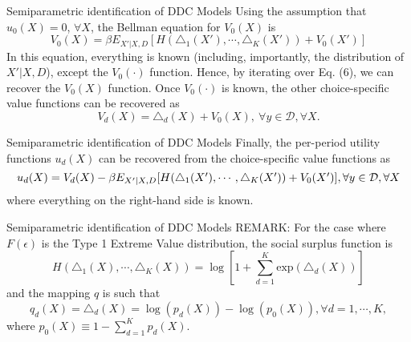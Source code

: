 \begin{frame}{Semiparametric identification of DDC Models}
Using the assumption that $u_0(X) = 0$, $\forall X$, the Bellman equation for $V_0(X)$ is 
\begin{equation}
V_0(X) = \beta E_{X'|X,D} [ H (\triangle_1(X'), \cdots , \triangle_K(X')) + V_0(X')]
\end{equation}
In this equation, everything is known (including, importantly, the distribution of $X'|X, D$), except the $V_0(\cdot)$ function. Hence, by iterating over Eq. (6), we can recover the $V_0(X)$ function. Once $V_0(\cdot)$ is known, the other choice-specific value functions can be recovered as 
\begin{equation*}
V_d(X) = \triangle_d(X) + V_0(X), ~ \forall y \in \mathcal{D}, \forall X.
\end{equation*}
\end{frame}

\begin{frame}{Semiparametric identification of DDC Models}
Finally, the per-period utility functions $u_d(X)$ can be recovered from the choice-specific value functions as 
\begin{equation*}
\resizebox{.99 \hsize}{!}{$ u_d(X) = V_d(X) - \beta E_{X'|X,D} [ H (\triangle_1 (X'), \cdots , \triangle_K(X')) + V_0(X') ], \forall y \in \mathcal{D}, \forall X $}
\end{equation*}
where everything on the right-hand side is known. 
\end{frame}


\begin{frame}{Semiparametric identification of DDC Models}
REMARK: For the case where $F (\epsilon)$ is the Type 1 Extreme Value distribution, the social surplus function is 
\begin{equation*}
H(\triangle_1(X), \cdots , \triangle_K (X)) = \log \left [ 1 + \sum^K_{d=1} \text{exp} (\triangle_d(X)) \right ]
\end{equation*}
and the mapping $q$ is such that
\begin{equation*}
q_d(X) = \triangle_d(X) = \log (p_d(X)) - \log(p_0(X)), \forall d = 1, \cdots , K ,
\end{equation*}
where $p_0(X) \equiv 1 - \sum^K_{d=1} p_d(X).$
\end{frame}

